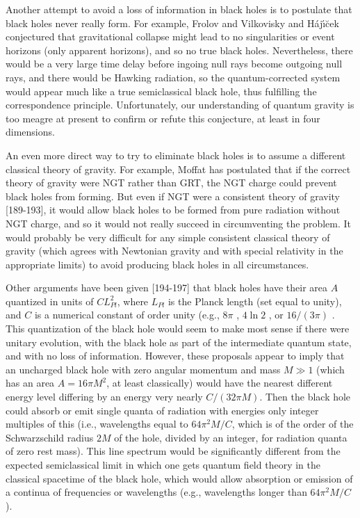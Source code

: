      Another attempt to avoid a loss of information in black holes is
to
postulate that black holes never really form.  For example, Frolov
and
Vilkovisky \cite{FV79,FV81} and H\'{a}j\'{\i}\u{c}ek
\cite{Haj86,Haj87}
conjectured that gravitational collapse might lead to no
singularities or
event horizons (only apparent horizons), and so no true black holes.
Nevertheless, there would be a very large time delay before ingoing
null rays become outgoing null rays, and there would be Hawking
radiation,
so the quantum-corrected system would appear much like a
true semiclassical black hole, thus fulfilling the correspondence
principle.
Unfortunately, our understanding of quantum gravity is too meagre
at present to confirm or refute this conjecture, at least in four
dimensions.

     An even more direct way to try to eliminate black holes is to
assume
a different classical theory of gravity.  For example, Moffat
\cite{Mof93,Mof93b} has postulated that if the correct theory of
gravity
were NGT rather than GRT, the NGT charge could prevent black holes
from forming.  But even if NGT were
a consistent theory of gravity [189-193],
it would allow black holes to be formed from pure radiation without
NGT
charge, and so it would not really succeed in circumventing the
problem.
It would probably be very difficult for any simple consistent
classical theory
of gravity (which agrees with Newtonian gravity and with special
relativity
in the appropriate limits) to avoid producing black holes in all
circumstances.

     Other arguments have been given [194-197] that
black holes have their area $A$ quantized in units of $CL_{Pl}^2$,
where $L_{Pl}$ is the Planck length (set equal to unity), and $C$ is
a numerical constant of order unity (e.g., $8\pi$ \cite{Bek74b},
$4\ln 2$ \cite{Muk,GarBel},
or $16/(3\pi)$ \cite{Peleg}.  This quantization of the black hole
would seem
to make
most sense if there were unitary evolution, with the black hole as
part of the
intermediate quantum state, and with no loss of information.
However, these
proposals appear to imply \cite{Muk} that an uncharged black hole
with zero
angular momentum and mass $M\gg 1$ (which has an area $A=16\pi M^2$,
at least classically) would have the nearest different energy level
differing
by
an energy very nearly $C/(32\pi M)$.  Then the black hole could
absorb or emit
single quanta of radiation with energies only integer multiples of
this
(i.e., wavelengths equal to $64\pi^2 M/C$, which is of the order of
the
Schwarzschild radius $2M$ of the hole, divided by an integer, for
radiation
quanta of zero rest mass).  This line spectrum \cite{Muk} would be
significantly different from the
expected semiclassical limit in which one gets quantum field theory
in the
classical spacetime of the black hole, which would allow absorption
or
emission of a continua of frequencies or wavelengths (e.g.,
wavelengths
longer than $64\pi^2 M/C$).

